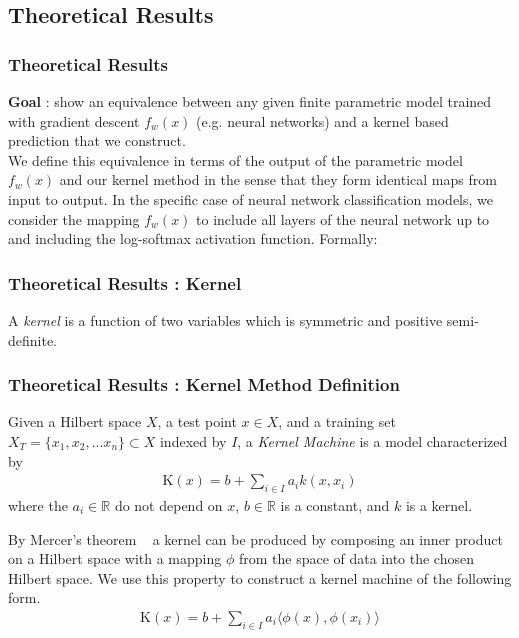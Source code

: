 \subsection{Theoretical Results}

\begin{frame}
  \frametitle{Theoretical Results}
  \textbf{Goal} : show an equivalence between any given finite
  parametric model trained with gradient descent $f_w(x)$
  (e.g. neural networks) and a kernel based prediction that we
  construct. \\


  We define this equivalence in terms of the output of the parametric model $f_w(x)$ and our kernel method in the sense that they form identical maps from input to output. In the specific case of neural network classification models, we consider the mapping $f_w(x)$ to include all layers of the neural network up to and including the log-softmax activation function. Formally:
\end{frame}

\begin{frame}
  \frametitle{Theoretical Results : Kernel}
\begin{definition}
A \emph{kernel} is a function of two variables which is symmetric and positive semi-definite. 
\end{definition}
\end{frame}

\begin{frame}
  \frametitle{Theoretical Results : Kernel Method Definition}
\begin{definition}
Given a Hilbert space $X$, a test point $x \in X$, and a training set $X_T = \{x_1,x_2,...x_n\} \subset X$ indexed by $I$, a \emph{Kernel Machine} is a model characterized by 
\begin{align}
    \text{K}(x) = b + \sum_{i\in I} a_i k(x,x_i)
\end{align}
where the $a_i \in \mathbb{R}$ do not depend on $x$, $b \in \mathbb{R}$ is a constant, and $k$ is a kernel. ~\cite{rasmussen2006gaussian}

By Mercer's theorem ~\cite{ghojogh2021} a kernel can be produced by composing an inner product on a Hilbert space with a mapping $\phi$ from the space of data into the chosen Hilbert space.
We use this property to construct a kernel machine of the following form.
\begin{align}
    \text{K}(x) = b + \sum_{i\in I} a_i \langle \phi(x), \phi(x_i) \rangle
\end{align}
\end{definition}
\end{frame}


